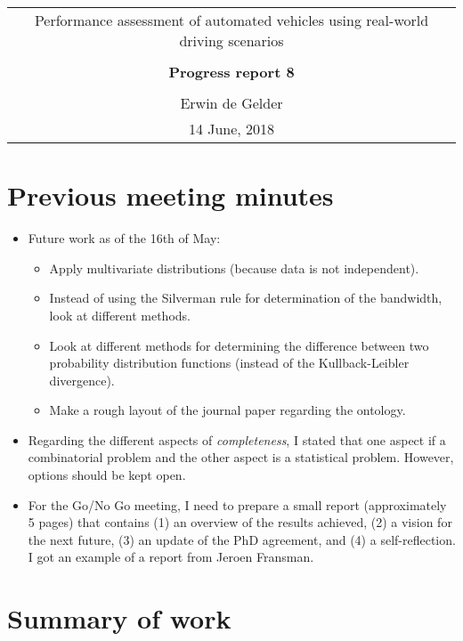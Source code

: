 \documentclass[10pt,final,a4paper,oneside,onecolumn]{article}
\newcommand{\progressreportnumber}{8}
\renewcommand{\author}{Erwin de Gelder}
\renewcommand{\date}{14 June, 2018}
\renewcommand{\title}{Performance assessment of automated vehicles using real-world driving scenarios}
\begin{document}
	
\begin{center}
	\begin{tabular}{c}
		\title \\ \\
		\textbf{\huge Progress report \progressreportnumber} \\ \\
		\author \\ 
		\date
	\end{tabular}
\end{center}

\section{Previous meeting minutes}

\begin{itemize}
	\item Future work as of the 16th of May:
	\begin{itemize}
		\item Apply multivariate distributions (because data is not independent).
		\item Instead of using the Silverman rule for determination of the bandwidth, look at different methods.
		\item Look at different methods for determining the difference between two probability distribution functions (instead of the Kullback-Leibler divergence).
		\item Make a rough layout of the journal paper regarding the ontology.
	\end{itemize}
	\item Regarding the different aspects of \emph{completeness}, I stated that one aspect if a combinatorial problem and the other aspect is a statistical problem. However, options should be kept open.
	\item For the Go/No Go meeting, I need to prepare a small report (approximately 5 pages) that contains (1) an overview of the results achieved, (2) a vision for the next future, (3) an update of the PhD agreement, and (4) a self-reflection. I got an example of a report from Jeroen Fransman.
\end{itemize}

\section{Summary of work}
\end{document}
